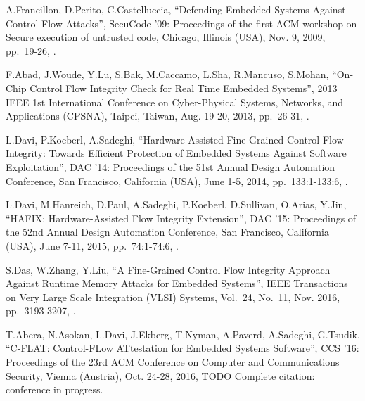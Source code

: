 \begin{thebibliography}{99}
A.Francillon, D.Perito, C.Castelluccia,
``Defending Embedded Systems Against Control Flow Attacks'',
SecuCode '09: Proceedings of the first ACM workshop on Secure execution of untrusted code,
Chicago, Illinois (USA), Nov. 9, 2009,
pp.\ 19-26,
.

F.Abad, J.Woude, Y.Lu, S.Bak, M.Caccamo, L.Sha, R.Mancuso, S.Mohan,
``On-Chip Control Flow Integrity Check for Real Time Embedded Systems'',
2013 IEEE 1st International Conference on Cyber-Physical Systems, Networks, and Applications (CPSNA),
Taipei, Taiwan, Aug. 19-20, 2013,
pp.\ 26-31,
.

L.Davi, P.Koeberl, A.Sadeghi,
``Hardware-Assisted Fine-Grained Control-Flow Integrity: Towards Efficient Protection of Embedded Systems Against Software Exploitation'',
DAC '14: Proceedings of the 51st Annual Design Automation Conference,
San Francisco, California (USA), June 1-5, 2014,
pp.\ 133:1-133:6,
.

L.Davi, M.Hanreich, D.Paul, A.Sadeghi, P.Koeberl, D.Sullivan, O.Arias, Y.Jin,
``HAFIX: Hardware-Assisted Flow Integrity Extension'',
DAC '15: Proceedings of the 52nd Annual Design Automation Conference,
San Francisco, California (USA), June 7-11, 2015,
pp.\ 74:1-74:6,
.

S.Das, W.Zhang, Y.Liu,
``A Fine-Grained Control Flow Integrity Approach Against Runtime Memory Attacks for Embedded Systems'',
IEEE Transactions on Very Large Scale Integration (VLSI) Systems,
Vol.\ 24, No.\ 11,
Nov. 2016,
pp.\ 3193-3207,
.

T.Abera, N.Asokan, L.Davi, J.Ekberg, T.Nyman, A.Paverd, A.Sadeghi, G.Tsudik,
``C-FLAT: Control-FLow ATtestation for Embedded Systems Software'',
CCS '16: Proceedings of the 23rd ACM Conference on Computer and Communications Security,
Vienna (Austria), Oct. 24-28, 2016,
TODO Complete citation: conference in progress.


\end{thebibliography}
